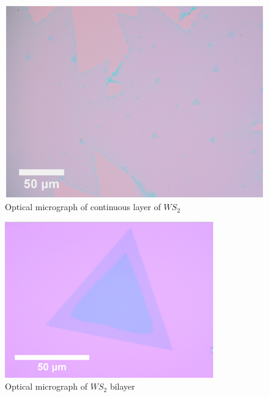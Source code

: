 \begin{figure}[h]
	\begin{center}
		\includegraphics[scale=0.3]{PaperSIOpticalContinous.png}
		\caption{Optical micrograph of continuous layer of $WS_2$}
		\label{fig:PaperSIOpticalContinous}
	\end{center}
\end{figure}

\begin{figure}[h]
	\begin{center}
		\includegraphics[scale=0.3]{PaperSIOpticalAFM.png}
		\caption{Optical micrograph of $WS_2$ bilayer}
		\label{fig:PaperSIOpticalAFM}
	\end{center}
\end{figure}


